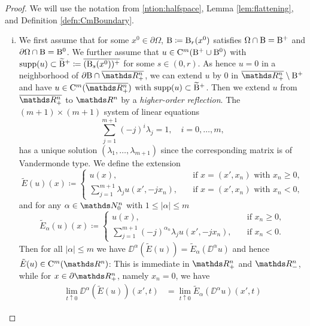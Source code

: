 \begin{proof}
  We will use the notation from \ref{ntion:halfspace}, Lemma \ref{lem:flattening}, and Definition \ref{defn:CmBoundary}.
  \begin{enumerate}[i)]
    \item We first assume that for some $x^0 \in \partial \Omega$, $\mathrm{B} \coloneqq \mathrm{B}_r(x^0)$ satisfies $\Omega \cap \mathrm{B} = \mathrm{B}^+$ and $\partial\Omega \cap \mathrm{B} = \mathrm{B}^0$.
      We further assume that $u \in \mathrm{C}^m(\mathrm{B}^+ \cup \mathrm{B}^0)$ with $\operatorname{supp}(u) \subset \widetilde {\mathrm{B}}^+ \coloneqq \overline{(\mathrm{B}_s(x^0))^+}$ for some $s \in (0,r)$.
      As hence $u = 0$ in a neighborhood of $\partial\BB \cap \overline{\R^n_+}$, we can extend $u$ by $0$ in $\overline{\R^n_+} \setminus \BB^+$ and have $u \in \CC^m(\overline{\R^n_+})$ with $\operatorname{supp}(u) \subset \widetilde {\mathrm{B}}^+$.
      Then we extend $u$ from $\overline{\R^n_+}$ to $\R^n$ by a \emph{higher-order reflection}.
      The $(m + 1)\times(m+1)$ system of linear equations
      \begin{equation}
        \label{eq:sle}
        \sum_{j = 1}^{m + 1} (-j)^i \lambda_j = 1, \quad i = 0,\dots,m,
      \end{equation}
      has a unique solution $(\lambda_1,\dots,\lambda_{m + 1})$ since the corresponding matrix is of Vandermonde type.
      We define the extension
      $$
      \tilde E(u) (x) \coloneqq 
      \begin{cases}
        u(x), &\quad\text{if } x = (x',x_n) \text{ with } x_n \geq 0,\\
        \sum_{j = 1}^{m + 1} \lambda_j u(x',-jx_n), &\quad\text{if } x = (x', x_n) \text{ with } x_n < 0,
      \end{cases}
      $$
      and for any $\alpha \in \N_0^n$ with $1 \leq |\alpha| \leq m$
      $$
      \tilde E_\alpha (u) (x) \coloneqq
      \begin{cases}
        u(x), &\quad\text{if } x_n \geq 0,\\
        \sum_{j = 1}^{m + 1} (-j)^{\alpha_n}\lambda_j u(x',-jx_n), &\quad\text{if } x_n < 0.
      \end{cases}
      $$
      Then for all $|\alpha| \leq m$ we have $\DD^\alpha(\tilde E(u)) = \tilde E_\alpha(\DD^\alpha u)$ and hence $\tilde E (u) \in \CC^m(\R^n)$:
      This is immediate in $\R^n_+$ and $\R^n_-$, while for $x \in \partial \R^n_+$, namely $x_n = 0$, we have
      \begin{align*}
        \lim_{t \uparrow 0 } \DD^\alpha(\tilde E(u))(x',t)
        &= \lim_{t \uparrow 0} \tilde E_\alpha(\DD^\alpha u)(x', t)

\end{align*}
\end{enumerate}
\end{proof}

